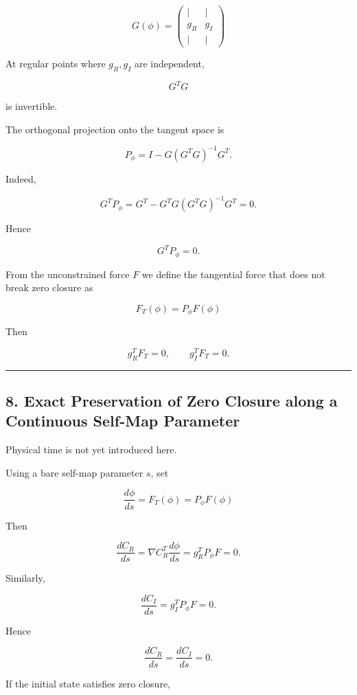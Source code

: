 \documentclass[
  a4paper,
]{article}
\begin{document}
\[
\boxed{
G(\phi)
=
\begin{pmatrix}
|&|\\
g_R&g_I\\
|&|
\end{pmatrix}
}
\tag{20}
\]

At regular points where \(g_R,g_I\) are independent,

\[
G^TG
\]

is invertible.

The orthogonal projection onto the tangent space is

\[
\boxed{
P_\phi
=
I
-
G(G^TG)^{-1}G^T.
}
\tag{21}
\]

Indeed,

\[
G^TP_\phi
=
G^T
-
G^TG(G^TG)^{-1}G^T
=
0.
\]

Hence

\[
\boxed{
G^TP_\phi=0.
}
\tag{22}
\]

From the unconstrained force \(F\) we define the tangential force that
does not break zero closure as

\[
\boxed{
F_T(\phi)
=
P_\phi F(\phi)
}
\tag{23}
\]

Then

\[
g_R^TF_T=0,
\qquad
g_I^TF_T=0.
\tag{24}
\]

\begin{center}\rule{0.5\linewidth}{0.5pt}\end{center}

\subsection{8. Exact Preservation of Zero Closure along a Continuous
Self-Map
Parameter}\label{exact-preservation-of-zero-closure-along-a-continuous-self-map-parameter}

Physical time is not yet introduced here.

Using a bare self-map parameter \(s\), set

\[
\boxed{
\frac{d\phi}{ds}
=
F_T(\phi)
=
P_\phi F(\phi)
}
\tag{25}
\]

Then

\[
\frac{dC_R}{ds}
=
\nabla C_R^T
\frac{d\phi}{ds}
=
g_R^TP_\phi F
=
0.
\]

Similarly,

\[
\frac{dC_I}{ds}
=
g_I^TP_\phi F
=
0.
\]

Hence

\[
\boxed{
\frac{dC_R}{ds}
=
\frac{dC_I}{ds}
=
0.
}
\tag{26}
\]

If the initial state satisfies zero closure,
\end{document}

